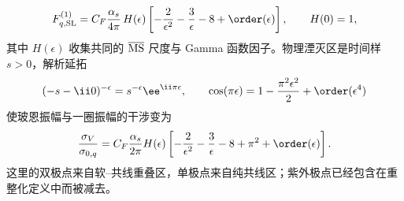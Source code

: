 \begin{derivation}
\begin{equation*}
 F_{q,\rm SL}^{(1)}
 =C_F\frac{\alpha_s}{4\pi}\,H(\epsilon)
 \left[-\frac2{\epsilon^2}-\frac3\epsilon-8+\order(\epsilon)\right],
 \qquad H(0)=1,
\end{equation*}
其中 $H(\epsilon)$ 收集共同的 $\overline{\rm MS}$ 尺度与 Gamma 函数因子。物理湮灭区是时间样 $s>0$，解析延拓
\begin{equation*}
 (-s-\ii0)^{-\epsilon}=s^{-\epsilon}\ee^{\ii\pi\epsilon},
 \qquad
 \cos(\pi\epsilon)=1-\frac{\pi^2\epsilon^2}{2}+\order(\epsilon^4)
\end{equation*}
使玻恩振幅与一圈振幅的干涉变为
\begin{equation*}
 \frac{\sigma_V}{\sigma_{0,q}}
 =C_F\frac{\alpha_s}{2\pi}H(\epsilon)
 \left[-\frac2{\epsilon^2}-\frac3\epsilon-8+\pi^2+\order(\epsilon)\right].
\end{equation*}
这里的双极点来自软--共线重叠区，单极点来自纯共线区；紫外极点已经包含在重整化定义中而被减去。


\end{derivation}
